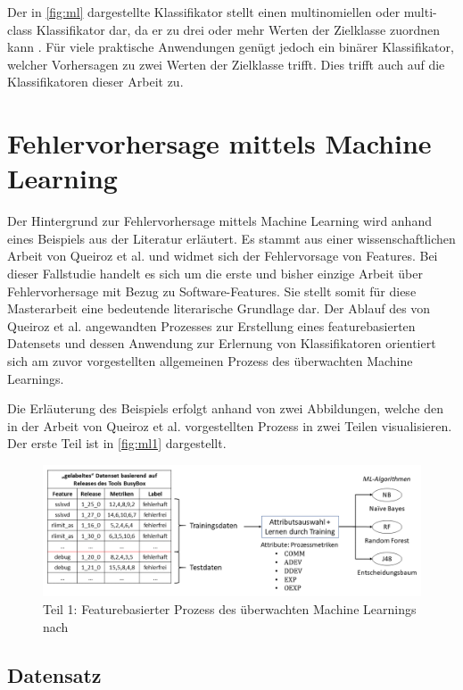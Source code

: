 Der in \autoref{fig:ml} dargestellte Klassifikator stellt einen multinomiellen oder multi-class Klassifikator dar, da er zu drei oder mehr Werten der Zielklasse zuordnen kann \cite{Sammut2017}. Für viele praktische Anwendungen genügt jedoch ein binärer Klassifikator, welcher Vorhersagen zu zwei Werten der Zielklasse trifft. Dies trifft auch auf die Klassifikatoren dieser Arbeit zu.

\section{Fehlervorhersage mittels Machine Learning}

Der Hintergrund zur Fehlervorhersage mittels Machine Learning wird anhand eines Beispiels aus der Literatur erläutert. Es stammt aus einer wissenschaftlichen Arbeit von Queiroz et al. \cite{Queiroz2016} und widmet sich der Fehlervorsage von Features. Bei dieser Fallstudie handelt es sich um die erste und bisher einzige Arbeit über Fehlervorhersage mit Bezug zu Software-Features. Sie stellt somit für diese Masterarbeit eine bedeutende literarische Grundlage dar. Der Ablauf des von Queiroz et al. angewandten Prozesses zur Erstellung eines featurebasierten Datensets und dessen Anwendung zur Erlernung von Klassifikatoren orientiert sich am zuvor vorgestellten allgemeinen Prozess des überwachten Machine Learnings.

Die Erläuterung des Beispiels erfolgt anhand von zwei Abbildungen, welche den in der Arbeit von Queiroz et al. vorgestellten Prozess in zwei Teilen visualisieren. Der erste Teil ist in \autoref{fig:ml1} dargestellt.

\begin{figure}[t]
    \centering
    \captionsetup{justification=centering}
    \includegraphics[width=\textwidth]{images/ML1}
    \caption{Teil 1: Featurebasierter Prozess des überwachten Machine Learnings nach \cite{Queiroz2016}}\label{fig:ml1}
\end{figure}

\subsection*{Datensatz}

